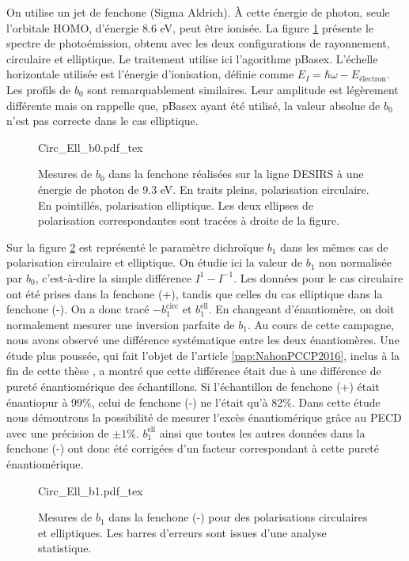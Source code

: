 On utilise un jet de fenchone (Sigma Aldrich). \`{A} cette énergie de photon, seule l'orbitale HOMO, d'énergie 8.6 eV, peut être ionisée. La figure \ref{fig:circ_ell_b0} présente le spectre de photoémission, obtenu avec les deux configurations de rayonnement, circulaire et elliptique. Le traitement utilise ici l'agorithme pBasex. L'échelle horizontale utilisée est l'énergie d'ionisation, définie comme $E_I = \hbar\omega - E_{\text{\'electron}}$. Les profils de $b_0$ sont remarquablement similaires. Leur amplitude est légèrement différente mais on rappelle que, pBasex ayant été utilisé, la valeur absolue de $b_0$ n'est pas correcte dans le cas elliptique.

\begin{figure}[!ht]
\centering
\def\svgwidth{0.8\columnwidth}
{Circ_Ell_b0.pdf_tex}
\caption{Mesures de $b_0$ dans la fenchone réalisées sur la ligne DESIRS à une énergie de photon de 9.3 eV. En traits pleins, polarisation circulaire. En pointillés, polarisation elliptique. Les deux ellipses de polarisation correspondantes sont tracées à droite de la figure.}
\label{fig:circ_ell_b0}
\end{figure}

Sur la figure \ref{fig:circ_ell_b1} est représenté le paramètre dichroïque $b_1$ dans les mêmes cas de polarisation circulaire et elliptique. On étudie ici la valeur de $b_1$ non normalisée par $b_0$, c'est-à-dire la simple différence $I^1-I^{-1}$. Les données pour le cas circulaire ont été prises dans la fenchone (+), tandis que celles du cas elliptique dans la fenchone (-). On a donc tracé $-b_1^{\text{circ}}$ et $b_1^{\text{ell}}$. En changeant d'énantiomère, on doit normalement mesurer une inversion parfaite de $b_1$. Au cours de cette campagne, nous avons observé une différence systématique entre les deux énantiomères. Une étude plus poussée, qui fait l'objet de l'article \ref{pap:NahonPCCP2016}, inclus à la fin de cette thèse , a montré que cette différence était due à une différence de pureté énantiomérique des échantillons. Si l'échantillon de fenchone (+) était énantiopur à 99\%, celui de fenchone (-) ne l'était qu'à 82\%. Dans cette étude nous démontrons la possibilité de mesurer l'excès énantiomérique grâce au PECD avec une précision de $\pm1$\%. $b_1^{\text{ell}}$ ainsi que toutes les autres données dans la fenchone (-) ont donc été corrigées d'un facteur correspondant à cette pureté énantiomérique.

\begin{figure}[!ht]
\centering
\def\svgwidth{0.8\columnwidth}
{Circ_Ell_b1.pdf_tex}
\caption{Mesures de $b_1$ dans la fenchone (-) pour des polarisations circulaires et elliptiques. Les barres d'erreurs sont issues d'une analyse statistique.}
\label{fig:circ_ell_b1}
\end{figure}


